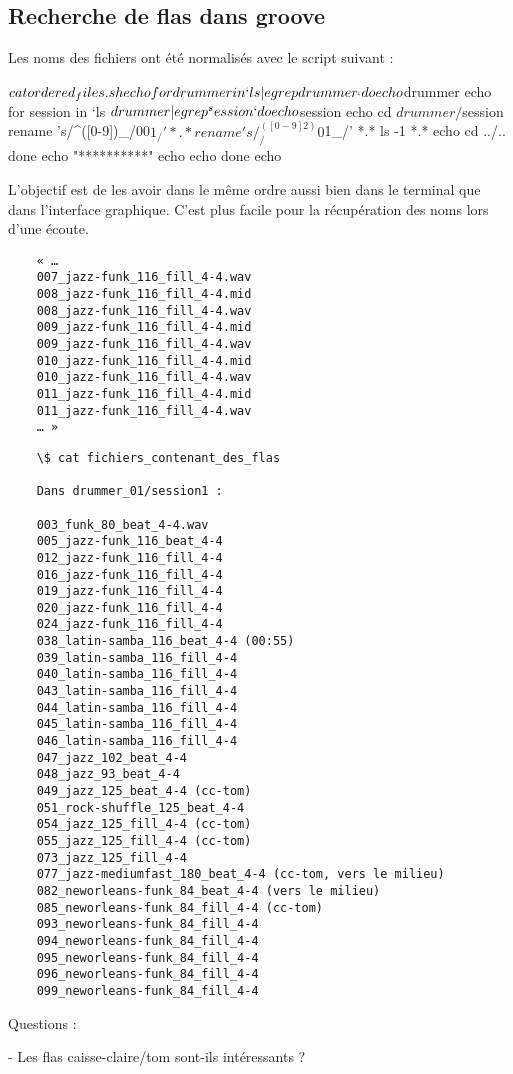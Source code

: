 \documentclass{report}
\begin{document}
	\subsection{Recherche de flas dans groove}
	Les noms des fichiers ont été normalisés avec le script suivant :
	\begin{verbatimtab}
	$ cat ordered_files.sh 
	echo
	for drummer in `ls | egrep drummer_`
	do
		echo $drummer
		echo
		for session in `ls $drummer | egrep ^session`
		do
			echo $session
			echo
			cd $drummer/$session
			rename 's/^([0-9])_/00$1_/' *.* 
			rename 's/^([0-9]{2})_/0$1_/' *.* 
			ls -1 *.*
			echo
			cd ../..
		done
		echo "**********"
		echo
		echo
	done
	echo
	\end{verbatimtab}
	L’objectif est de les avoir dans le même ordre aussi bien dans le terminal que dans
	l’interface graphique. C’est plus facile pour la récupération des noms lors d’une écoute.
	\begin{verbatim}
	« …
	007_jazz-funk_116_fill_4-4.wav
	008_jazz-funk_116_fill_4-4.mid
	008_jazz-funk_116_fill_4-4.wav
	009_jazz-funk_116_fill_4-4.mid
	009_jazz-funk_116_fill_4-4.wav
	010_jazz-funk_116_fill_4-4.mid
	010_jazz-funk_116_fill_4-4.wav
	011_jazz-funk_116_fill_4-4.mid
	011_jazz-funk_116_fill_4-4.wav
	… »
	\end{verbatim}
	\newpage
	\begin{verbatim}
	\$ cat fichiers_contenant_des_flas 
	
	Dans drummer_01/session1 :
	
	003_funk_80_beat_4-4.wav
	005_jazz-funk_116_beat_4-4
	012_jazz-funk_116_fill_4-4
	016_jazz-funk_116_fill_4-4
	019_jazz-funk_116_fill_4-4
	020_jazz-funk_116_fill_4-4
	024_jazz-funk_116_fill_4-4
	038_latin-samba_116_beat_4-4 (00:55)
	039_latin-samba_116_fill_4-4
	040_latin-samba_116_fill_4-4
	043_latin-samba_116_fill_4-4
	044_latin-samba_116_fill_4-4
	045_latin-samba_116_fill_4-4
	046_latin-samba_116_fill_4-4
	047_jazz_102_beat_4-4
	048_jazz_93_beat_4-4
	049_jazz_125_beat_4-4 (cc-tom)
	051_rock-shuffle_125_beat_4-4
	054_jazz_125_fill_4-4 (cc-tom)
	055_jazz_125_fill_4-4 (cc-tom)
	073_jazz_125_fill_4-4
	077_jazz-mediumfast_180_beat_4-4 (cc-tom, vers le milieu)
	082_neworleans-funk_84_beat_4-4 (vers le milieu)
	085_neworleans-funk_84_fill_4-4 (cc-tom)
	093_neworleans-funk_84_fill_4-4
	094_neworleans-funk_84_fill_4-4
	095_neworleans-funk_84_fill_4-4
	096_neworleans-funk_84_fill_4-4
	099_neworleans-funk_84_fill_4-4
	\end{verbatim}
	Questions :
	
	- Les flas caisse-claire/tom sont-ils intéressants ?
	\newpage
\end{document}
